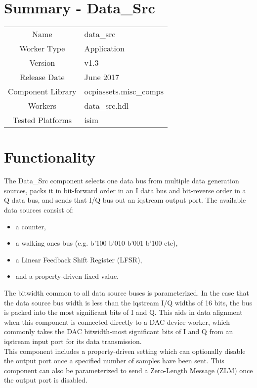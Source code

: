 \documentclass{article}
\author{} %
\date{Version \docVersion} %
\title{\docTitle}
\def\comp{temp}
\def\comp{data\_src}
\def\Comp{TEMP}
\def\Comp{Data\_Src }
\begin{document}
\section*{Summary - \Comp}
\begin{tabular}{|c|M{13.5cm}|}
	\hline
	                  &                                                                                \\
	\hline
	Name              & \comp                                                                          \\
	\hline
	Worker Type       & Application                                                                    \\
	\hline
	Version           &  v1.3                                                                         \\
	\hline
	Release Date      & June 2017 \\
	\hline
	Component Library & ocpiassets.misc\_comps \\
	\hline
	Workers           & \comp.hdl \\
	\hline
	Tested Platforms  & isim \\
	\hline
\end{tabular}

\section*{Functionality}
\begin{flushleft}
\justify
  The \Comp component selects one data bus from multiple data generation sources, packs it in bit-forward order in an I data bus and bit-reverse order in a Q data bus, and sends that I/Q bus out an iqstream output port. The available data sources consist of:
  \begin{itemize}
  \item a counter,
  \item a walking ones bus (e.g. b'100 \textrightarrow b'010 \textrightarrow b'001 \textrightarrow b'100 \textrightarrow etc),
  \item a Linear Feedback Shift Register (LFSR),
  \item and a property-driven fixed value.
  \end{itemize}
  The bitwidth common to all data source buses is parameterized. In the case that the data source bus width is less than the iqstream I/Q widths of 16 bits, the bus is packed into the most significant bits of I and Q. This aids in data alignment when this component is connected directly to a DAC device worker, which commonly takes the DAC bitwidth-most significant bits of I and Q from an iqstream input port for its data transmission. \\ \medskip
  This component includes a property-driven setting which can optionally disable the output port once a specified number of samples have been sent. This component can also be parameterized to send a Zero-Length Message (ZLM) once the output port is disabled.
\end{flushleft}
\end{document}
